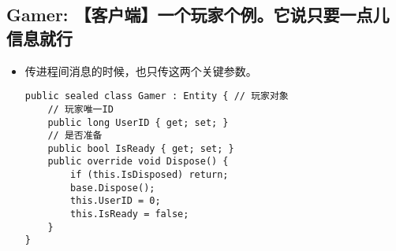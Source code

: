 \documentclass[9pt, b5paper]{article}
\begin{document}
\subsection{Gamer: 【客户端】一个玩家个例。它说只要一点儿信息就行}
\label{sec-3-4}
\begin{itemize}
\item 传进程间消息的时候，也只传这两个关键参数。
\begin{verbatim}
public sealed class Gamer : Entity { // 玩家对象
    // 玩家唯一ID
    public long UserID { get; set; }
    // 是否准备
    public bool IsReady { get; set; }
    public override void Dispose() {
        if (this.IsDisposed) return;
        base.Dispose();
        this.UserID = 0;
        this.IsReady = false;
    }
}
\end{verbatim}
\end{itemize}
\end{document}
